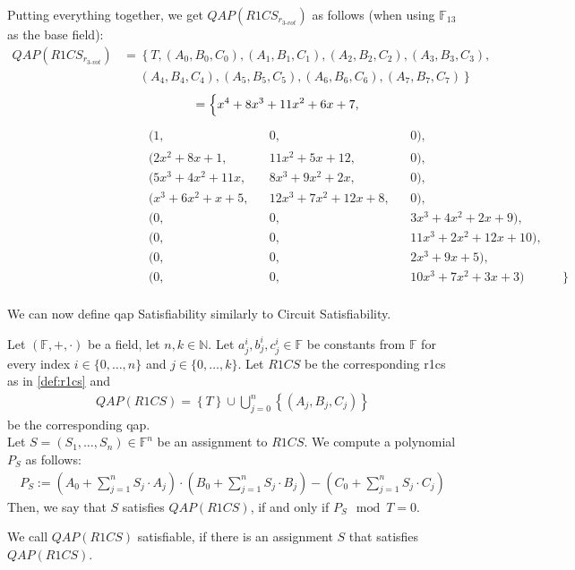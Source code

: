 Putting everything together, we get $QAP(R1CS_{r_{3\text{-}vot}})$ as follows (when using $\mathbb{F}_{13}$ as the base field):
\begin{align*}
    QAP(R1CS_{r_{3\text{-}vot}}) &= \left\{T, (A_0, B_0, C_0), (A_1, B_1, C_1), (A_2, B_2, C_2), (A_3, B_3, C_3),\right.\\
    &\phantom{=}\left.(A_4, B_4, C_4), (A_5, B_5, C_5), (A_6, B_6, C_6), (A_7, B_7, C_7)\right\}
\end{align*}
\begin{align*}
    \phantom{QAP(R1CS_{r_{3\text{-}vot}})}&= \Bigl\{x^4+8x^3+11x^2+6x+7,
\end{align*}
\begin{align*}
    \phantom{QAP(R1CS_{r_{3\text{-}vot}})}&\phantom{=bl} (1,&& 0,&& 0), &&\\
    &\phantom{=bl} (2x^2 + 8x + 1,&& 11x^2 + 5x + 12,&& 0),&&\\
    &\phantom{=bl} (5x^3 + 4x^2 + 11x,&& 8x^3 + 9x^2 + 2x,&& 0),&&\\
    &\phantom{=bl} (x^3 + 6x^2 + x + 5,&& 12x^3 + 7x^2 + 12x + 8,&& 0),&&\\
    &\phantom{=bl} (0,&& 0,&& 3x^3 + 4x^2 + 2x + 9),&&\\
    &\phantom{=bl} (0,&& 0,&& 11x^3 + 2x^2 + 12x + 10),&&\\
    &\phantom{=bl} (0,&& 0,&& 2x^3 + 9x + 5),&&\\
    &\phantom{=bl} (0,&& 0,&& 10x^3 + 7x^2 + 3x + 3)&&\Bigr\}\\
\end{align*}

We can now define \gls{qap} Satisfiability similarly to Circuit Satisfiability.

\begin{definition}
    \label{def:qapSat}
    Let $(\mathbb{F},+,\cdot )$ be a field, let $n,k\in\mathbb{N}$.
    Let $a_j^i,b_j^i,c_j^i\in\mathbb{F}$ be constants from $\mathbb{F}$ for every index $i\in\{0,\dots, n\}$ and $j\in\{0,\dots, k\}$.
    Let $R1CS$ be the corresponding \gls{r1cs} as in \cref{def:r1cs} and 
    \begin{align*}
        QAP(R1CS)=\left\{T\right\}\cup \bigcup_{j=0}^{n}\left\{\left(A_j, B_j, C_j\right)\right\}
    \end{align*}
    be the corresponding \gls{qap}.\\
    Let $S=(S_1,\dots, S_n)\in\mathbb{F}^n$ be an assignment to $R1CS$.
    We compute a polynomial $P_S$ as follows:
    \begin{align*}
        P_S:=\left(A_0+\sum_{j=1}^{n}S_j\cdot A_j\right)\cdot\left(B_0+\sum_{j=1}^{n}S_j\cdot B_j\right)-\left(C_0+\sum_{j=1}^{n}S_j\cdot C_j\right)
    \end{align*}
    Then, we say that $S$ satisfies $QAP(R1CS)$, if and only if $P_S\mod T = 0$.

    We call $QAP(R1CS)$ satisfiable, if there is an assignment $S$ that satisfies $QAP(R1CS)$.
\end{definition}

